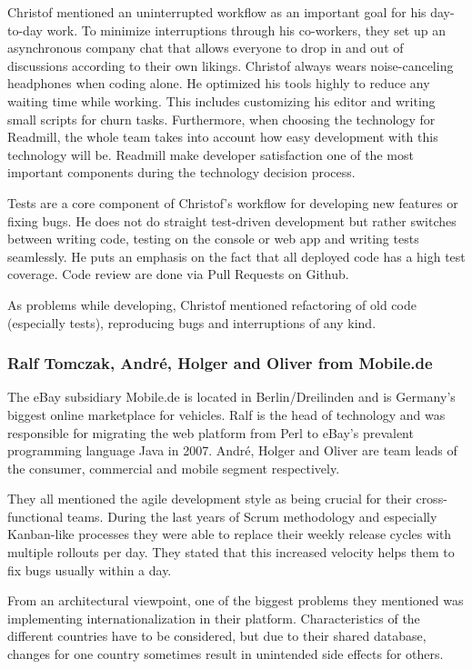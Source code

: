 Christof mentioned an uninterrupted workflow as an important goal for his day-to-day work. To minimize interruptions through his co-workers, they set up an asynchronous company chat that allows everyone to drop in and out of discussions according to their own likings. Christof always wears noise-canceling headphones when coding alone. He optimized his tools highly to reduce any waiting time while working. This includes customizing his editor and writing small scripts for churn tasks. Furthermore, when choosing the technology for Readmill, the whole team takes into account how easy development with this technology will be. Readmill make developer satisfaction one of the most important components during the technology decision process.

Tests are a core component of Christof's workflow for developing new features or fixing bugs. He does not do straight test-driven development but rather switches between writing code, testing on the console or web app and writing tests seamlessly. He puts an emphasis on the fact that all deployed code has a high test coverage. Code review are done via Pull Requests on Github.

As problems while developing, Christof mentioned refactoring of old code (especially tests), reproducing bugs and interruptions of any kind.

\subsubsection{Ralf Tomczak, Andr\'e, Holger and Oliver from Mobile.de}
The eBay subsidiary Mobile.de is located in Berlin/Dreilinden and is Germany's biggest online marketplace for vehicles. Ralf is the head of technology and was responsible for migrating the web platform from Perl to eBay's prevalent programming language Java in 2007. Andr\'e, Holger and Oliver are team leads of the consumer, commercial and mobile segment respectively.

They all mentioned the agile development style as being crucial for their cross-functional teams. During the last years of Scrum methodology and especially Kanban-like processes they were able to replace their weekly release cycles with multiple rollouts per day. They stated that this increased velocity helps them to fix bugs usually within a day.

From an architectural viewpoint, one of the biggest problems they mentioned was implementing internationalization in their platform. Characteristics of the different countries have to be considered, but due to their shared database, changes for one country sometimes result in unintended side effects for others.

